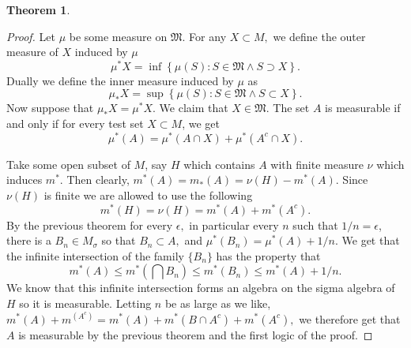 \documentclass[letter]{article}
\newtheorem{theorem}{Theorem}
\newenvironment{menumerate}{%
  \edef\backupindent{\the\parindent}%
  \enumerate%
  \setlength{\parindent}{\backupindent}%
}{\endenumerate}
\begin{document}
\begin{menumerate}
\begin{theorem}
	\end{theorem}
	\begin{proof}
		Let $\mu$ be some measure on $\mathfrak{M}.$ For any $X \subset M,$ we define
		the outer measure of $X$ induced by $\mu$
		\begin{equation}
			\mu^*X = \inf\left\{\mu(S): S \in \mathfrak{M} \wedge S \supset X\right\}.
		\end{equation}
		Dually we define the inner measure induced by $\mu$ as
		\begin{equation}
				\mu_*X = \sup\left\{\mu(S): S \in \mathfrak{M} \wedge S \subset X\right\}.
		\end{equation}
		Now suppose that $\mu_*X = \mu^*X.$ We claim that $X \in \mathfrak{M}.$ 
		The set $A$ is measurable if and only if for every test set $X \subset M$,
		we get
		\begin{equation}
			\mu^*(A) = \mu^*(A \cap X) + \mu^*(A^c \cap X).
		\end{equation}
		
		Take some open subset of $M$, say $H$ which contains $A$ with finite measure $\nu$ which induces $m^*.$
		Then clearly,
		$m^*(A) = m_*(A) = \nu(H) - m^*(A).$ Since $\nu(H)$ is finite we are allowed to use the following 
		\begin{equation}
			m^*(H) = \nu(H) = m^*(A) + m^*(A^c).
		\end{equation}
		By the previous theorem for every $\epsilon,$ in particular every $n$ such that $1/n = \epsilon$,
		there is a $B_n \in M_\sigma$ so that $B_n \subset A,$ and $\mu^*(B_n) = \mu^*(A) + 1/n.$ 
		We get that the infinite intersection of the family $\{B_n\}$ has the property that
		\begin{equation}
			m^*(A) \leq m^*(\bigcap B_n) \leq m^*(B_n) \leq m^*(A) + 1/n.
		\end{equation}
		We know that this infinite intersection forms an algebra on the sigma algebra of $H$
		so it is measurable. Letting $n$ be as large as we like,
		$m^*(A) + m^(A^c) = m^*(A) + m^*(B\cap A^c) + m^*(A^c),$
		we therefore get that $A$ is measurable by the previous theorem and the first logic of the proof.
	\end{proof}
\end{menumerate} 
\end{document}
